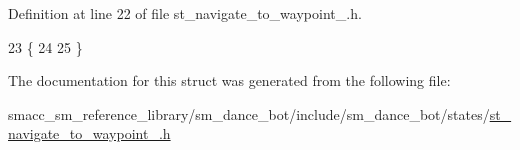 Definition at line 22 of file st\+\_\+navigate\+\_\+to\+\_\+waypoint\+\_.\+h.


\begin{DoxyCode}
23   \{
24     
25   \}
\end{DoxyCode}


The documentation for this struct was generated from the following file\+:\begin{DoxyCompactItemize}
\item 
smacc\+\_\+sm\+\_\+reference\+\_\+library/sm\+\_\+dance\+\_\+bot/include/sm\+\_\+dance\+\_\+bot/states/\hyperlink{st__navigate__to__waypoint__1_8h}{st\+\_\+navigate\+\_\+to\+\_\+waypoint\+\_.\+h}\end{DoxyCompactItemize}
